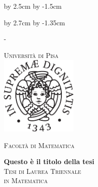 \advance\vsize by 2.5cm %
\advance\voffset by -1.5cm %


\begin{titlingpage}


\advance\hsize by 2.7cm %
\advance\hoffset by -1.35cm %




\calccentering{\unitlength}
\begin{adjustwidth*}{\unitlength}{-\unitlength}


\thispagestyle{empty}
\begin{center}
\large
\textsc{\Large Università di Pisa\\}
\vspace{0.6cm}
\includegraphics[width=3.8cm]{cherubino.pdf}

\vspace{0.8cm}
\textsc{\Large{Facoltà di Matematica}}\\



\vspace{2.5cm}


{\Huge\textbf{Questo è il titolo della tesi}}
\\[2.0cm]

\textsc{Tesi di Laurea Triennale \\[0.2cm] in Matematica}\\
\vspace{0.5cm}

\begin{center}

\end{center}

\vspace{0.2cm}

%
%


\end{center}
\end{adjustwidth*}
\end{titlingpage}
